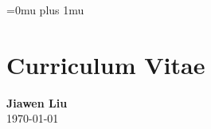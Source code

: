 \documentclass[12pt, letterpaper]{report}   %
\begin{document}
% 



\newpage
\singlespace
\Urlmuskip=0mu plus 1mu\relax %
 




\chapter*{Curriculum Vitae}
\begin{large}
\begin{center}
\textbf{Jiawen Liu}\\ 
\today\\
\end{center}
\end{large}
\end{document}
